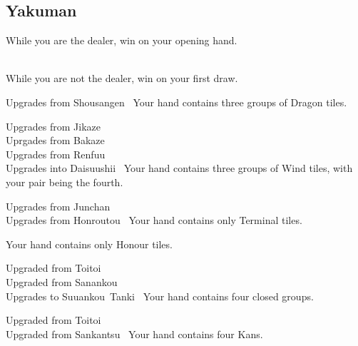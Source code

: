 \subsection{Yakuman}\label{core:ssec:yakuman-yaku}

	{\closedhand}
	{While you are the dealer, win on your opening hand.}

	{\closedhand \\
	\brokenhand}
	{While you are not the dealer, win on your first draw.}

	{\upgradesfrom Upgrades from Shousangen~}
	{Your hand contains three groups of Dragon tiles.}

	{\upgradesfrom Upgrades from Jikaze~\\
	\upgradesfrom Uprgades from Bakaze~\\
	\upgradesfrom Upgrades from Renfuu~ \\
	\upgradesto Upgrades into Daisuushii~}
	{Your hand contains three groups of Wind tiles, with your pair being the fourth.}

	{\upgradesfrom Upgrades from Junchan~ \\
	\upgradesfrom Upgrades from Honroutou~}
	{Your hand contains only Terminal tiles.}

	{}
	{Your hand contains only Honour tiles.}

	{\upgradesfrom Upgraded from Toitoi~ \\
	\upgradesfrom Upgraded from Sanankou~ \\
	\upgradesto Upgrades to Suuankou~Tanki~}
	{Your hand contains four closed groups.}

	{\upgradesfrom Upgraded from Toitoi~ \\
	\upgradesfrom Upgraded from Sankantsu~}
	{Your hand contains four Kans.}

